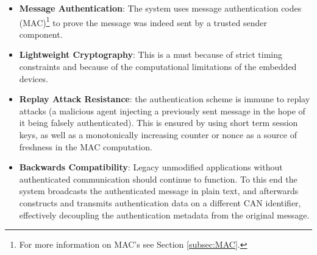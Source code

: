 \begin{itemize}
	\item \textbf{Message Authentication}: The system uses message authentication codes (MAC)\footnote{For more information on MAC's see Section \ref{subsec:MAC}.} to prove the message was indeed sent by a trusted sender component.
	
	\item \textbf{Lightweight Cryptography}: This is a must because of strict timing constraints and because of the computational limitations of the embedded devices. 
	
	\item \textbf{Replay Attack Resistance}: the authentication scheme is immune to replay attacks (a malicious agent injecting a previously sent message in the hope of it being falsely authenticated). This is ensured by using short term session keys, as well as a monotonically increasing counter or nonce as a source of freshness in the MAC computation.
	
	\item \textbf{Backwards Compatibility}: Legacy unmodified applications without authenticated communication should continue to function. To this end the system broadcasts the authenticated message in plain text, and afterwards constructs and transmits authentication data on a different CAN identifier, effectively decoupling the authentication metadata from the original message.
\end{itemize}



